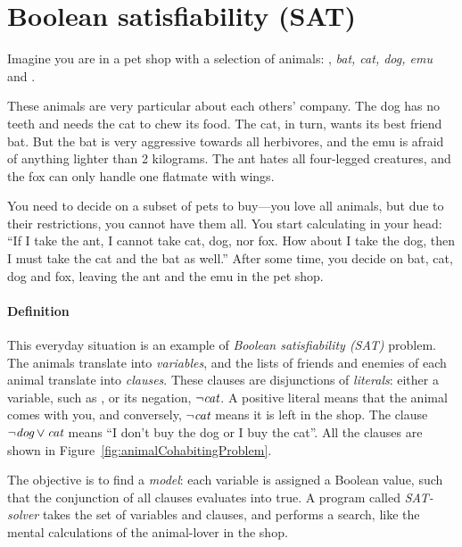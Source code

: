 \def\ant{\text{\em ant}}
\def\bat{\text{\em bat}}
\def\cat{\text{\em cat}}
\def\dog{\text{\em dog}}
\def\emu{\text{\em emu}}
\def\fox{\text{\em fox}}


\section{Boolean satisfiability (SAT)}
\label{sec:SAT-intro}

Imagine you are in a pet shop with a selection of animals: \ant, {\em bat, cat, dog, emu} and \fox.

These animals are very particular about each others' company. The dog has no teeth and needs the cat to chew its food. The cat, in turn, wants its best friend bat. 
But the bat is very aggressive towards all herbivores, and the emu is afraid of anything lighter than 2 kilograms. The ant hates all four-legged creatures, and the fox can only handle one flatmate with wings. 

You need to decide on a subset of pets to buy---you love all animals, but due to their restrictions, you cannot have them all. You start calculating in your head: ``If I take the ant, I cannot take cat, dog, nor fox. How about I take the dog, then I must take the cat and the bat as well.''
After some time, you decide on bat, cat, dog and fox, leaving the ant and the emu in the pet shop.

\paragraph{Definition}

This everyday situation is an example of \emph{Boolean satisfiability (SAT)} problem.
The animals translate into \emph{variables}, %
and the lists of friends and enemies of each animal translate into \emph{clauses}.
These clauses are disjunctions of \emph{literals}: either a variable, such as \cat, or its negation, $\neg\cat$.
A positive literal \cat{} means that the animal comes with you, 
and conversely, $\neg\cat{}$ means it is left in the shop. 
The clause $\neg\dog \vee \cat{}$ means ``I don't buy the dog or I buy the cat''. 
All the clauses are shown in Figure~\ref{fig:animalCohabitingProblem}.


The objective is to find a \emph{model}: each variable is assigned a Boolean value, such that the conjunction of all clauses evaluates into true. A program called \emph{SAT-solver} takes the set of variables and clauses, and performs a search, like the mental calculations of the animal-lover in the shop.


